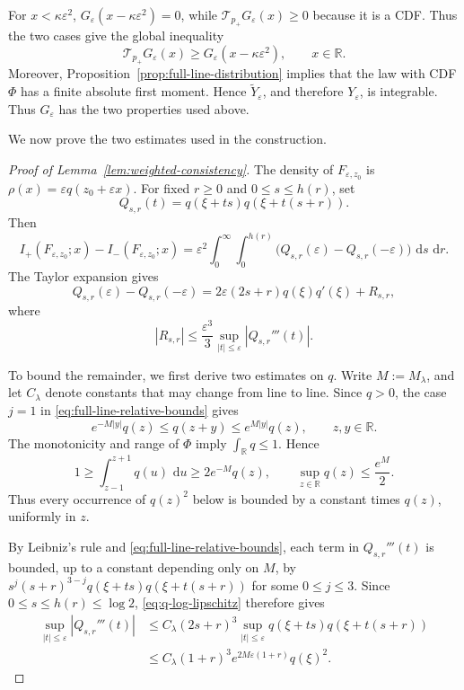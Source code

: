 \documentclass[12pt,preprint]{amsart}
\numberwithin{equation}{section}
\theoremstyle{plain}
\theoremstyle{definition}
\newcommand{\dd}{\,\mathrm d}
\begin{document}
For $x<\kappa\varepsilon^2$,
$G_\varepsilon(x-\kappa\varepsilon^2)=0$, while
$\mathcal T_{p_+}G_\varepsilon(x)\ge0$ because it is a CDF.  Thus the two
cases give the global inequality
\begin{equation*}
 \mathcal T_{p_+}G_\varepsilon(x)
 \ge G_\varepsilon(x-\kappa\varepsilon^2),
 \qquad x\in\mathbb R.
\end{equation*}
Moreover, Proposition~\ref{prop:full-line-distribution} implies that the law
with CDF $\Phi$ has a finite absolute first moment.  Hence $\widetilde Y_\varepsilon$, and therefore
$Y_\varepsilon$, is integrable.  Thus $G_\varepsilon$ has the two properties
used above.


We now prove the two estimates used in the construction.

\begin{proof}[Proof of Lemma~\ref{lem:weighted-consistency}]


The density of $F_{\varepsilon,z_0}$ is
$\rho(x)=\varepsilon q(z_0+\varepsilon x)$.
For fixed $r\ge0$ and
$0\le s\le h(r)$, set
\[
 Q_{s,r}(t)=q(\xi+ts)q(\xi+t(s+r)).
\]
Then
\[
 I_+(F_{\varepsilon,z_0};x)-I_-(F_{\varepsilon,z_0};x)
 =\varepsilon^2\int_0^\infty\int_0^{h(r)}
 \bigl(Q_{s,r}(\varepsilon)-Q_{s,r}(-\varepsilon)\bigr)
 \,\dd s\,\dd r.
\]
The Taylor expansion gives
\[
 Q_{s,r}(\varepsilon)-Q_{s,r}(-\varepsilon)
 =2\varepsilon(2s+r)q(\xi)q'(\xi)+R_{s,r},
\]
where
\[
 |R_{s,r}|\le\frac{\varepsilon^3}{3}
 \sup_{|t|\le\varepsilon}|Q_{s,r}'''(t)|.
\]

To bound the remainder, we first derive two estimates on $q$. Write $M:=M_\lambda$, and let $C_\lambda$ denote constants that may change from line to line. Since $q>0$, the case $j=1$ in
\eqref{eq:full-line-relative-bounds} gives
\begin{equation}
 e^{-M|y|}q(z)\le q(z+y)\le e^{M|y|}q(z),
 \qquad z,y\in\mathbb R.
 \label{eq:q-log-lipschitz}
\end{equation}
The monotonicity and range of $\Phi$ imply
$\int_{\mathbb R}q\le1$.  Hence
\begin{equation}
 1\ge\int_{z-1}^{z+1}q(u)\,\dd u
 \ge 2e^{-M}q(z),
 \qquad
 \sup_{z\in\mathbb R}q(z)\le\frac{e^M}{2}.
 \label{eq:q-uniform-bound}
\end{equation}
Thus every occurrence of $q(z)^2$ below is bounded by a constant times
$q(z)$, uniformly in $z$.

By Leibniz's rule and
\eqref{eq:full-line-relative-bounds}, each term in
$Q_{s,r}'''(t)$ is bounded, up to a constant depending only on $M$, by
$s^j(s+r)^{3-j}q(\xi+ts)q(\xi+t(s+r))$ for some $0\le j\le3$.
Since $0\le s\le h(r)\le\log2$,
\eqref{eq:q-log-lipschitz} therefore gives
\[
\begin{aligned}
 \sup_{|t|\le\varepsilon}|Q_{s,r}'''(t)|
 &\le C_\lambda(2s+r)^3
   \sup_{|t|\le\varepsilon}
   q(\xi+ts)q(\xi+t(s+r))\\
 &\le C_\lambda(1+r)^3e^{2M\varepsilon(1+r)}q(\xi)^2.
\end{aligned}
\]



\end{proof}
\end{document}
